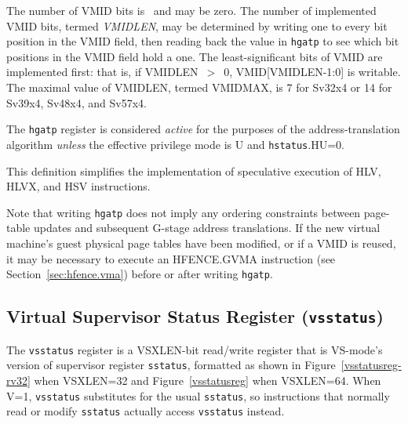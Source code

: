 The number of VMID bits is \unspecified\ and may be zero.
The number of implemented VMID bits, termed {\mbox {\em VMIDLEN}}, may be
determined by writing one to every bit position in the VMID field, then reading
back the value in {\tt hgatp} to see which bit positions in the VMID field hold
a one.
The least-significant bits of VMID are implemented first:
that is, if VMIDLEN~$>$~0, VMID[VMIDLEN-1:0] is writable.
The maximal value of VMIDLEN, termed VMIDMAX, is 7 for Sv32x4 or 14 for Sv39x4,
Sv48x4, and Sv57x4.

The {\tt hgatp} register is considered {\em active} for the purposes of the
address-translation algorithm {\em unless} the effective privilege mode is U
and {\tt hstatus}.HU=0.

\begin{commentary}
This definition simplifies the implementation of speculative execution of
HLV, HLVX, and HSV instructions.
\end{commentary}

Note that writing {\tt hgatp} does not imply any ordering constraints between
page-table updates and subsequent G-stage address translations.
If the new virtual machine's guest physical page tables have been modified,
or if a VMID is reused,
it may be necessary to execute an HFENCE.GVMA instruction
(see Section~\ref{sec:hfence.vma}) before or after writing {\tt hgatp}.

\subsection{Virtual Supervisor Status Register ({\tt vsstatus})}

The {\tt vsstatus} register is a VSXLEN-bit read/write register that is
VS-mode's version of supervisor register {\tt sstatus}, formatted as
shown in Figure~\ref{vsstatusreg-rv32} when VSXLEN=32 and
Figure~\ref{vsstatusreg} when VSXLEN=64.
When V=1, {\tt vsstatus} substitutes for the usual {\tt sstatus}, so
instructions that normally read or modify {\tt sstatus} actually access
{\tt vsstatus} instead.

